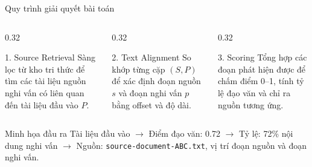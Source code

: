 \documentclass[aspectratio=169,11pt]{beamer}
\def\textbf#1{#1}%
\begin{document}
\begin{frame}{Quy trình giải quyết bài toán}
\begin{columns}[T]
\begin{column}{0.32\textwidth}
\begin{block}{1. Source Retrieval}
\footnotesize
Sàng lọc từ kho tri thức để tìm các tài liệu nguồn nghi vấn có liên quan đến tài liệu đầu vào $P$.
\end{block}
\end{column}

\begin{column}{0.32\textwidth}
\begin{block}{2. Text Alignment}
\footnotesize
So khớp từng cặp $(S,P)$ để xác định đoạn nguồn $s$ và đoạn nghi vấn $p$ bằng offset và độ dài.
\end{block}
\end{column}

\begin{column}{0.32\textwidth}
\begin{block}{3. Scoring}
\footnotesize
Tổng hợp các đoạn phát hiện được để chấm điểm 0--1, tính tỷ lệ đạo văn và chỉ ra nguồn tương ứng.
\end{block}
\end{column}
\end{columns}

\vspace{0.25cm}
\begin{block}{Minh họa đầu ra}
\small
\textbf{Tài liệu đầu vào} $\rightarrow$ \textbf{Điểm đạo văn:} 0.72 \; $\rightarrow$ \; \textbf{Tỷ lệ:} 72\% nội dung nghi vấn \; $\rightarrow$ \; \textbf{Nguồn:} \texttt{source-document-ABC.txt}, vị trí đoạn nguồn và đoạn nghi vấn.
\end{block}
\end{frame}
\end{document}
